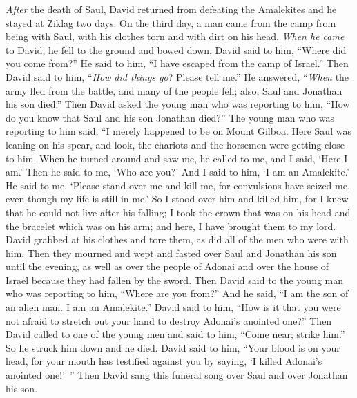 
\begin{biblechapter} %
 \textit{After} the death of Saul, David returned from defeating the Amalekites and he stayed at Ziklag two days.
\verse On the third day, a man came from the camp from being with Saul, with his clothes torn and with dirt on his head. \textit{When he came} to David, he fell to the ground and bowed down.
\verse David said to him, “Where did you come from?” He said to him, “I have escaped from the camp of Israel.”
\verse Then David said to him, “\textit{How did things go}? Please tell me.” He answered, “\textit{When} the army fled from the battle, and many of the people fell; also, Saul and Jonathan his son died.”
\verse Then David asked the young man who was reporting to him, “How do you know that Saul and his son Jonathan died?”
\verse The young man who was reporting to him said, “I merely happened to be on Mount Gilboa. Here Saul was leaning on his spear, and look, the chariots and the horsemen were getting close to him.
\verse When he turned around and saw me, he called to me, and I said, ‘Here I am.’
\verse Then he said to me, ‘Who are you?’ And I said to him, ‘I am an Amalekite.’
\verse He said to me, ‘Please stand over me and kill me, for convulsions have seized me, even though my life is still in me.’
\verse So I stood over him and killed him, for I knew that he could not live after his falling; I took the crown that was on his head and the bracelet which was on his arm; and here, I have brought them to my lord.
\verse David grabbed at his clothes and tore them, as did all of the men who were with him.
\verse Then they mourned and wept and fasted over Saul and Jonathan his son until the evening, as well as over the people of Adonai and over the house of Israel because they had fallen by the sword.
\verse Then David said to the young man who was reporting to him, “Where are you from?” And he said, “I am the son of an alien man. I am an Amalekite.”
\verse David said to him, “How is it that you were not afraid to stretch out your hand to destroy Adonai’s anointed one?”
\verse Then David called to one of the young men and said to him, “Come near; strike him.” So he struck him down and he died.
\verse David said to him, “Your blood is on your head, for your mouth has testified against you by saying, ‘I killed Adonai’s anointed one!’ ”
 Then David sang this funeral song over Saul and over Jonathan his son.

\end{biblechapter}
